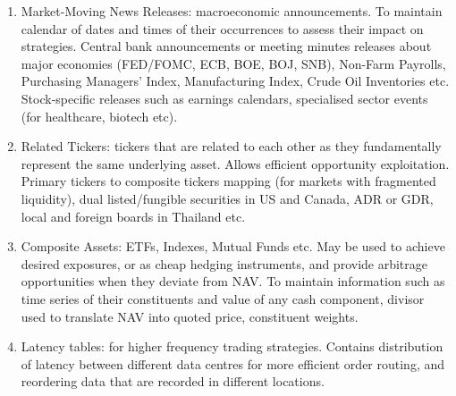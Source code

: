 \documentclass[a4paper,oneside,openany]{book}
\begin{document}
\begin{definition}
\begin{enumerate}[label=\roman*.]
\item Market-Moving News Releases: macroeconomic announcements. To maintain calendar of dates and times of their occurrences to assess their impact on strategies. Central bank announcements or meeting minutes releases about major economies (FED/FOMC, ECB, BOE, BOJ, SNB), Non-Farm Payrolls, Purchasing Managers' Index, Manufacturing Index, Crude Oil Inventories etc.\\
Stock-specific releases such as earnings calendars, specialised sector events (for healthcare, biotech etc).
\item Related Tickers: tickers that are related to each other as they fundamentally represent the same underlying asset. Allows efficient opportunity exploitation. Primary tickers to composite tickers mapping (for markets with fragmented liquidity), dual listed/fungible securities in US and Canada, ADR or GDR, local and foreign boards in Thailand etc.
\item Composite Assets: ETFs, Indexes, Mutual Funds etc. May be used to achieve desired exposures, or as cheap hedging instruments, and provide arbitrage opportunities when they deviate from NAV. To maintain information such as time series of their constituents and value of any cash component, divisor used to translate NAV into quoted price, constituent weights.
\item Latency tables: for higher frequency trading strategies. Contains distribution of latency between different data centres for more efficient order routing, and reordering data that are recorded in different locations.
\end{enumerate}
\end{definition}
\end{document}
